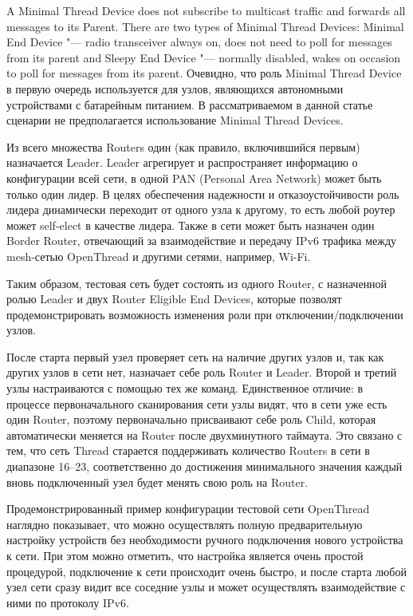 A Minimal Thread Device does not subscribe to multicast traffic and forwards all messages to its Parent. There are two types of Minimal Thread Devices: Minimal End Device "--- radio transceiver always on, does not need to poll for messages from its parent and Sleepy End Device "--- normally disabled, wakes on occasion to poll for messages from its parent. Очевидно, что роль Minimal Thread Device в первую очередь используется для узлов, являющихся автономными устройствами с батарейным питанием. В рассматриваемом в данной статье сценарии не предполагается использование Minimal Thread Devices. 

Из всего множества Routers один (как правило, включившийся первым) назначается Leader. Leader агрегирует и распространяет информацию о конфигурации всей сети, в одной PAN (Personal Area Network) может быть только один лидер.  В целях обеспечения надежности и отказоустойчивости роль лидера динамически переходит от одного узла к другому, то есть любой роутер может self-elect в качестве лидера. Также в сети может быть назначен один Border Router, отвечающий за взаимодействие и передачу IPv6 трафика между mesh-сетью OpenThread и другими сетями, например, Wi-Fi.

Таким образом, тестовая сеть будет состоять из одного Router, с назначенной ролью Leader и двух Router Eligible End Devices, которые позволят продемонстрировать возможность изменения роли при отключении/подключении узлов.

После старта первый узел проверяет сеть на наличие других узлов и, так как других узлов в сети нет, назначает себе роль Router и Leader. Второй и третий узлы настраиваются с помощью тех же команд. Единственное отличие: в процессе первоначального сканирования сети узлы видят, что в сети уже есть один Router, поэтому первоначально присваивают себе роль Child, которая автоматически меняется на Router после двухминутного таймаута. Это связано с тем, что сеть Thread старается поддерживать количество Routers в сети в диапазоне 16--23, соответственно до достижения минимального значения каждый вновь подключенный узел будет менять свою роль на Router.

Продемонстрированный пример конфигурации тестовой сети OpenThread наглядно показывает, что можно осуществлять полную предварительную настройку устройств без необходимости ручного подключения нового устройства к сети. При этом можно отметить, что настройка является очень простой процедурой, подключение к сети происходит очень быстро, и после старта любой узел сети сразу видит все соседние узлы и может осуществлять взаимодействие с ними по протоколу IPv6.

